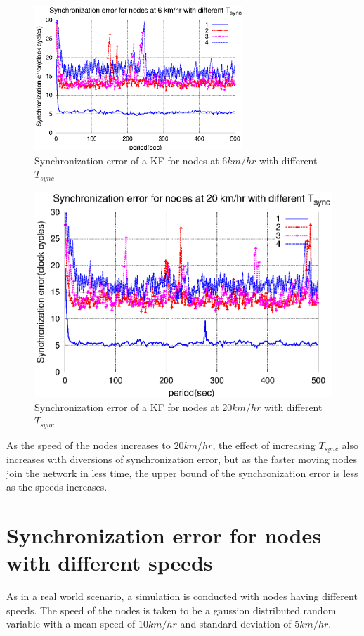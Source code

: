 \documentclass[a4paper,10pt]{report}
\begin{document}
\begin{figure}[!h]
\centering
\includegraphics[width= 0.7\textwidth]{tsync6}
\caption{Synchronization error of a KF for nodes at 6$km/hr$ with different $T_{sync}$} \label{tsync6}
\end{figure}
\begin{figure}[!h]
\centering
\includegraphics[width= 0.7 \textwidth]{tsync20}
\caption{Synchronization error of a KF for nodes at 20$km/hr$ with different $T_{sync}$} \label{tsync20}
\end{figure}
As the speed of the nodes increases to $20km/hr$, the effect of increasing $T_{sync}$ also increases with diversions of synchronization error, but as the faster moving nodes join the network in less time, the upper bound of the synchronization error is less as the speeds increases. 
\section{\textbf{Synchronization error for nodes with different speeds}}
As in a real world scenario, a simulation is conducted with nodes having different speeds. The speed of the nodes is taken to be a gaussion distributed random variable with a mean speed of $10km/hr$ and standard deviation of $5km/hr$.
\end{document}
